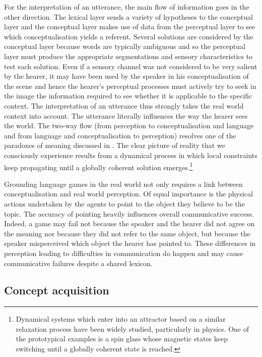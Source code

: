 For the interpretation of an utterance, the main 
flow of information goes in the other direction. The
lexical layer sends a variety of hypotheses to 
the conceptual layer and the conceptual layer makes use of data 
from the perceptual layer to see which conceptualisation
yields a referent. Several solutions are considered 
by the conceptual layer because words are typically 
ambiguous and so the perceptual 
layer must produce the appropriate segmentations and 
sensory characteristics to test each solution.
Even if a sensory channel was not considered to be 
very salient by the hearer, it may have been 
used by the speaker in his conceptualisation of the 
scene and hence the hearer's perceptual 
processes must actively try to seek in the 
image the information required to see whether it 
is applicable to the specific
context. The interpretation of an utterance
thus strongly takes the real world context into account. 
The utterance literally influences the way the 
hearer sees the world. The two-way flow (from perception
to conceptualisation and language and from language
and conceptualisation to perception) resolves one of the 
paradoxes of meaning discussed in . The 
clear picture of reality that we consciously experience
results from a dynamical process in which local constraints 
keep propagating until a globally coherent solution
emerges.\footnote{Dynamical systems which enter into an attractor
based on a similar relaxation process have been 
widely studied, particularly in physics. One of the 
prototypical examples is a spin glass whose magnetic
states keep switching until a globally coherent
state is reached.}

Grounding language games in the real world
not only requires a link between conceptualisation
and real world perception. Of equal importance is the physical
actions undertaken by the agents to point to the object they 
believe to be the topic. The accuracy of pointing
heavily influences overall communicative success. Indeed, a
game may fail not because
the speaker and the hearer did not agree on the meaning
nor because they did not refer to the same object, but because the 
speaker misperceived which object the hearer has pointed to. 
These differences in perception leading to difficulties
in communication do happen and may 
cause communicative failures despite a shared lexicon. 

\subsection{Concept acquisition}

